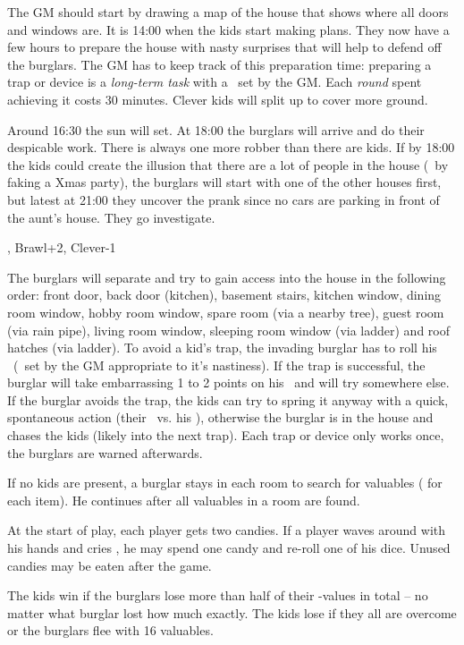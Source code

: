 {	

		\noindent
		The GM should start by drawing a map of the house that shows where all doors and windows are. It is 14:00 when the kids start making plans. They now have a few hours to prepare the house with nasty surprises that will help to defend off the burglars. The GM has to keep track of this preparation time: preparing a trap or device is a \emph{long-term task} with a \TN~set by the GM. Each \emph{round} spent achieving it costs 30 minutes. Clever kids will split up to cover more ground.

		Around 16:30 the sun will set. At 18:00 the burglars will arrive and do their despicable work. There is always one more robber than there are kids. If by 18:00 the kids could create the illusion that there are a lot of people in the house (\eg~by faking a Xmas party), the burglars will start with one of the other houses first, but latest at 21:00 they uncover the prank since no cars are parking in front of the aunt's house. They go investigate.

		, Brawl+2, Clever-1

		The burglars will separate and try to gain access into the house in the following order: front door, back door (kitchen), basement stairs, kitchen window, dining room window, hobby room window, spare room (via a nearby tree), guest room (via rain pipe), living room window, sleeping room window (via ladder) and roof hatches (via ladder). To avoid a kid's trap, the invading burglar has to roll his \RD\ (\TN~set by the GM appropriate to it's nastiness). If the trap is successful, the burglar will take embarrassing 1 to 2 points on his \HD\ and will try somewhere else. If the burglar avoids the trap, the kids can try to spring it anyway with a quick, spontaneous action (their \AD\ vs. his \RD), otherwise the burglar is in the house and chases the kids (likely into the next trap). Each trap or device only works once, the burglars are warned afterwards.

		If no kids are present, a burglar stays in each room to search for valuables ( for each item). He continues after all valuables in a room are found.


		\noindent
		At the start of play, each player gets two candies. If a player waves around with his hands and cries , he may spend one candy and re-roll one of his dice. Unused candies may be eaten after the game.


		\noindent
		The kids win if the burglars lose more than half of their \HD-values in total -- no matter what burglar lost how much exactly. The kids lose if they all are overcome or the burglars flee with 16 valuables.
}
